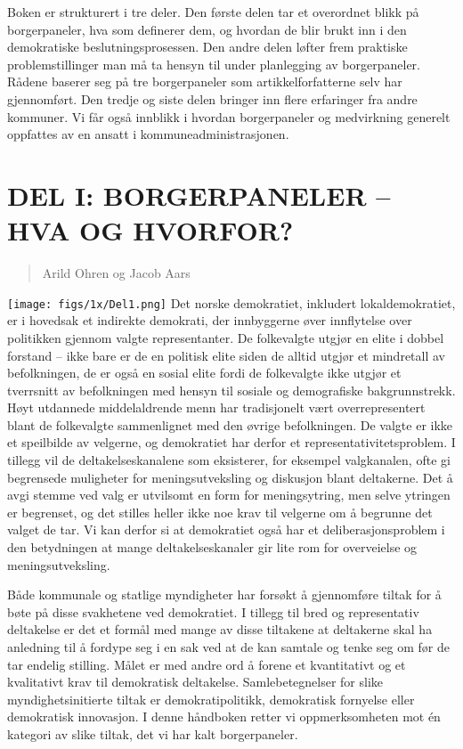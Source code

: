 \documentclass[
  12pt,
  a4paper, 12pt]{article}
\begin{document}
Boken er strukturert i tre deler. Den første delen tar et overordnet blikk på borgerpaneler, hva som definerer dem, og hvordan de blir brukt inn i den demokratiske beslutningsprosessen. Den andre delen løfter frem praktiske problemstillinger man må ta hensyn til under planlegging av borgerpaneler. Rådene baserer seg på tre borgerpaneler som artikkelforfatterne selv har gjennomført. Den tredje og siste delen bringer inn flere erfaringer fra andre kommuner. Vi får også innblikk i hvordan borgerpaneler og medvirkning generelt oppfattes av en ansatt i kommuneadministrasjonen.

\newpage

\hypertarget{del-i-borgerpaneler-hva-og-hvorfor}{%
\section{DEL I: BORGERPANELER -- HVA OG HVORFOR?}\label{del-i-borgerpaneler-hva-og-hvorfor}}

\begin{quote}
Arild Ohren og Jacob Aars
\end{quote}

\texttt{[image: figs/1x/Del1.png]}
Det norske demokratiet, inkludert lokaldemokratiet, er i hovedsak et indirekte demokrati, der innbyggerne øver innflytelse over politikken gjennom valgte representanter. De folkevalgte utgjør en elite i dobbel forstand -- ikke bare er de en politisk elite siden de alltid utgjør et mindretall av befolkningen, de er også en sosial elite fordi de folkevalgte ikke utgjør et tverrsnitt av befolkningen med hensyn til sosiale og demografiske bakgrunnstrekk. Høyt utdannede middelaldrende menn har tradisjonelt vært overrepresentert blant de folkevalgte sammenlignet med den øvrige befolkningen. De valgte er ikke et speilbilde av velgerne, og demokratiet har derfor et representativitetsproblem. I tillegg vil de deltakelseskanalene som eksisterer, for eksempel valgkanalen, ofte gi begrensede muligheter for meningsutveksling og diskusjon blant deltakerne. Det å avgi stemme ved valg er utvilsomt en form for meningsytring, men selve ytringen er begrenset, og det stilles heller ikke noe krav til velgerne om å begrunne det valget de tar. Vi kan derfor si at demokratiet også har et deliberasjonsproblem i den betydningen at mange deltakelseskanaler gir lite rom for overveielse og meningsutveksling.

Både kommunale og statlige myndigheter har forsøkt å gjennomføre tiltak for å bøte på disse svakhetene ved demokratiet. I tillegg til bred og representativ deltakelse er det et formål med mange av disse tiltakene at deltakerne skal ha anledning til å fordype seg i en sak ved at de kan samtale og tenke seg om før de tar endelig stilling. Målet er med andre ord å forene et kvantitativt og et kvalitativt krav til demokratisk deltakelse. Samlebetegnelser for slike myndighetsinitierte tiltak er demokratipolitikk, demokratisk fornyelse eller demokratisk innovasjon. I denne håndboken retter vi oppmerksomheten mot én kategori av slike tiltak, det vi har kalt borgerpaneler.
\end{document}
